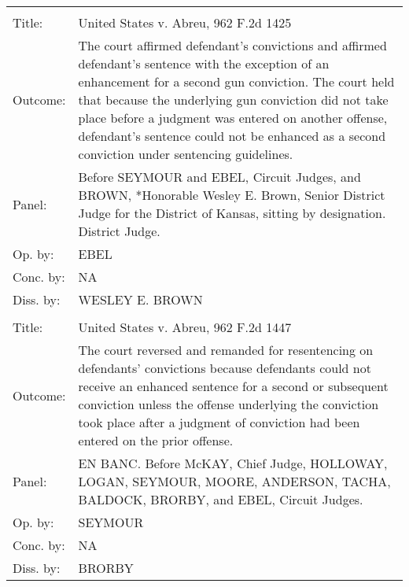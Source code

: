 \documentclass[10pt, letterpaper]{article}
\begin{document}
\begin{spacing}{1.0}
\begin{footnotesize}
\begin{longtable}[H]{lp{6in}}
        \arrayrulecolor{black}\hline\\[-4pt]
        Title: & United States v. Abreu, 962 F.2d 1425\\[2pt]
        Outcome: & The court affirmed defendant's convictions and affirmed defendant's sentence with the exception of an enhancement for a second gun conviction. The court held that because the underlying gun conviction did not take place before a judgment was entered on another offense, defendant's sentence could not be enhanced as a second conviction under sentencing guidelines.\\[2pt]
        Panel: & Before SEYMOUR and EBEL, Circuit Judges, and BROWN, *Honorable Wesley E. Brown, Senior District Judge for the District of Kansas, sitting by designation. District Judge.\\[2pt]
        Op. by: & EBEL \\[2pt]
        Conc. by: & NA\\[2pt]
        Diss. by: & WESLEY E. BROWN \\[2pt]
        \arrayrulecolor{gray}\hline\\[-4pt]
        Title: & United States v. Abreu, 962 F.2d 1447\\[2pt]
        Outcome: & The court reversed and remanded for resentencing on defendants' convictions because defendants could not receive an enhanced sentence for a second or subsequent conviction unless the offense underlying the conviction took place after a judgment of conviction had been entered on the prior offense.\\[2pt]
        Panel: & EN BANC. Before McKAY, Chief Judge, HOLLOWAY, LOGAN, SEYMOUR, MOORE, ANDERSON, TACHA, BALDOCK, BRORBY, and EBEL, Circuit Judges.  \\[2pt]
        Op. by: & SEYMOUR \\[2pt]
        Conc. by: & NA\\[2pt]
        Diss. by: & BRORBY \\[2pt]
        

\end{longtable}
\end{footnotesize}
\end{spacing}
\end{document}
